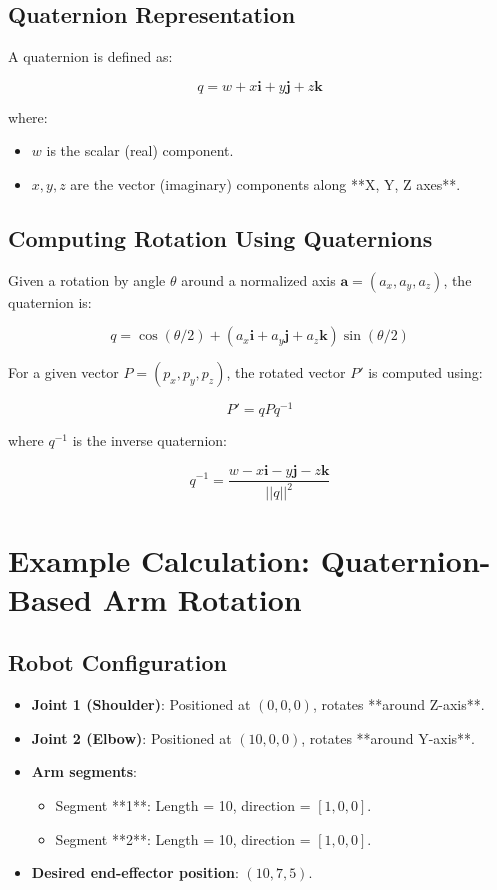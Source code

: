 \documentclass{article}
\begin{document}
\subsection{Quaternion Representation}
A quaternion is defined as:



\[
q = w + x\mathbf{i} + y\mathbf{j} + z\mathbf{k}
\]



where:
\begin{itemize}
    \item \( w \) is the scalar (real) component.
    \item \( x, y, z \) are the vector (imaginary) components along **X, Y, Z axes**.
\end{itemize}

\subsection{Computing Rotation Using Quaternions}
Given a rotation by angle \( \theta \) around a normalized axis \( \mathbf{a} = (a_x, a_y, a_z) \), the quaternion is:



\[
q = \cos(\theta/2) + (a_x\mathbf{i} + a_y\mathbf{j} + a_z\mathbf{k}) \sin(\theta/2)
\]



For a given vector \( P = (p_x, p_y, p_z) \), the rotated vector \( P' \) is computed using:



\[
P' = q P q^{-1}
\]



where \( q^{-1} \) is the inverse quaternion:



\[
q^{-1} = \frac{w - x\mathbf{i} - y\mathbf{j} - z\mathbf{k}}{||q||^2}
\]



\section{Example Calculation: Quaternion-Based Arm Rotation}
\subsection{Robot Configuration}
\begin{itemize}
    \item \textbf{Joint 1 (Shoulder)}: Positioned at \( (0, 0, 0) \), rotates **around Z-axis**.
    \item \textbf{Joint 2 (Elbow)}: Positioned at \( (10, 0, 0) \), rotates **around Y-axis**.
    \item \textbf{Arm segments}:
        \begin{itemize}
            \item Segment **1**: Length = 10, direction = \([1, 0, 0]\).
            \item Segment **2**: Length = 10, direction = \([1, 0, 0]\).
        \end{itemize}
    \item \textbf{Desired end-effector position}: \( (10, 7, 5) \).
\end{itemize}
\end{document}
